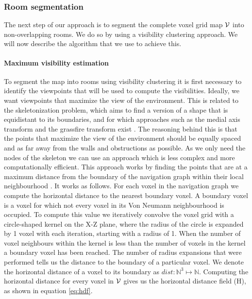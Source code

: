 \subsubsection{Room segmentation}
The next step of our approach is to segment the complete voxel grid map \(\mathcal{V}\) into non-overlapping rooms. We do so by using a visibility clustering approach. We will now describe the algorithm that we use to achieve this.

\paragraph{Maximum visibility estimation}
To segment the map into rooms using visibility clustering it is first necessary to identify the viewpoints that will be used to compute the visibilities. Ideally, we want viewpoints that maximize the view of the environment. This is related to the skeletonization problem, which aims to find a version of a shape that is equidistant to its boundaries, and for which approaches such as the medial axis transform and the grassfire transform exist \citep{bonnassie_new_2003,liu_extended_2011}. The reasoning behind this is that the points that maximize the view of the environment should be equally spaced and as far away from the walls and obstructions as possible. As we only need the nodes of the skeleton we can use an approach which is less complex and more computationally efficient. This approach works by finding the points that are at a maximum distance from the boundary of the navigation graph within their local neighbourhood \citep{mille_euclidean_2019}. It works as follows. For each voxel in the navigation graph we compute the horizontal distance to the nearest boundary voxel. A boundary voxel is a voxel for which not every voxel in its Von Neumann neighbourhood is occupied. To compute this value we iteratively convolve the voxel grid with a circle-shaped kernel on the X-Z plane, where the radius of the circle is expanded by 1 voxel with each iteration, starting with a radius of 1. When the number of voxel neighbours within the kernel is less than the number of voxels in the kernel a boundary voxel has been reached. The number of radius expansions that were performed tells us the distance to the boundary of a particular voxel. We denote the horizontal distance of a voxel to its boundary as \(dist: \mathbb{N}^{3} \mapsto \mathbb{N}\). Computing the horizontal distance for every voxel in \(\mathcal{V}\) gives us the horizontal distance field (H), as shown in equation \ref{eq:hdf}.

